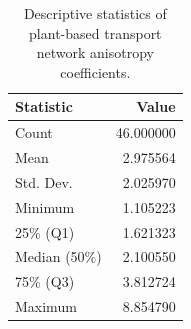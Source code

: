 \begin{table}[htbp]
\caption{Descriptive statistics of plant-based transport network anisotropy coefficients.}
\label{tab:stats_plant_anisotropy}
\begin{tabular}{lr}
\toprule
Statistic & Value \\
\midrule
Count & 46.000000 \\
Mean & 2.975564 \\
Std. Dev. & 2.025970 \\
Minimum & 1.105223 \\
25\% (Q1) & 1.621323 \\
Median (50\%) & 2.100550 \\
75\% (Q3) & 3.812724 \\
Maximum & 8.854790 \\
\bottomrule
\end{tabular}
\end{table}
